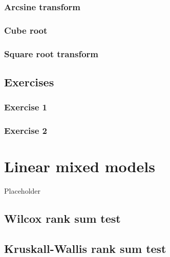 \documentclass[english,10pt,a4paper,oneside]{book}
\begin{document}
\hypertarget{arcsine-transform}{%
\subsection{Arcsine transform}\label{arcsine-transform}}

\hypertarget{cube-root}{%
\subsection{Cube root}\label{cube-root}}

\hypertarget{square-root-transform}{%
\subsection{Square root transform}\label{square-root-transform}}

\hypertarget{exercises-7}{%
\section{Exercises}\label{exercises-7}}

\hypertarget{exercise-1-7}{%
\subsection{Exercise 1}\label{exercise-1-7}}

\hypertarget{exercise-2-3}{%
\subsection{Exercise 2}\label{exercise-2-3}}

\hypertarget{linear-mixed-models}{%
\chapter{Linear mixed models}\label{linear-mixed-models}}

Placeholder

\hypertarget{wilcox-rank-sum-test-1}{%
\section{Wilcox rank sum test}\label{wilcox-rank-sum-test-1}}

\hypertarget{kruskall-wallis-rank-sum-test-1}{%
\section{Kruskall-Wallis rank sum test}\label{kruskall-wallis-rank-sum-test-1}}
\end{document}
